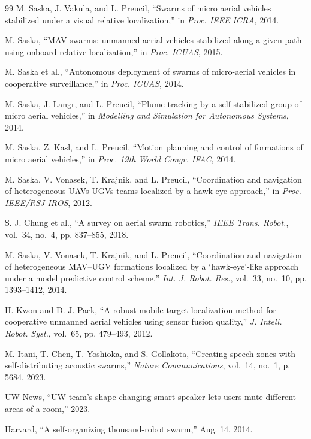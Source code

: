 \documentclass[journal,twoside]{IEEEtran}
\begin{document}
\begin{thebibliography}{99}
M. Saska, J. Vakula, and L. Preucil, ``Swarms of micro aerial vehicles stabilized under a visual relative localization,'' in \emph{Proc. IEEE ICRA}, 2014.

M. Saska, ``{MAV}-swarms: unmanned aerial vehicles stabilized along a given path using onboard relative localization,'' in \emph{Proc. ICUAS}, 2015.

M. Saska et al., ``Autonomous deployment of swarms of micro-aerial vehicles in cooperative surveillance,'' in \emph{Proc. ICUAS}, 2014.

M. Saska, J. Langr, and L. Preucil, ``Plume tracking by a self-stabilized group of micro aerial vehicles,'' in \emph{Modelling and Simulation for Autonomous Systems}, 2014.

M. Saska, Z. Kasl, and L. Preucil, ``Motion planning and control of formations of micro aerial vehicles,'' in \emph{Proc. 19th World Congr. IFAC}, 2014.

M. Saska, V. Vonasek, T. Krajnik, and L. Preucil, ``Coordination and navigation of heterogeneous {UAV}s-{UGV}s teams localized by a hawk-eye approach,'' in \emph{Proc. IEEE/RSJ IROS}, 2012.

S. J. Chung et al., ``A survey on aerial swarm robotics,'' \emph{IEEE Trans. Robot.}, vol.~34, no.~4, pp. 837--855, 2018.

M. Saska, V. Vonasek, T. Krajnik, and L. Preucil, ``Coordination and navigation of heterogeneous {MAV}–{UGV} formations localized by a ‘hawk-eye’-like approach under a model predictive control scheme,'' \emph{Int. J. Robot. Res.}, vol.~33, no.~10, pp. 1393--1412, 2014.

H. Kwon and D. J. Pack, ``A robust mobile target localization method for cooperative unmanned aerial vehicles using sensor fusion quality,'' \emph{J. Intell. Robot. Syst.}, vol.~65, pp. 479--493, 2012.

M. Itani, T. Chen, T. Yoshioka, and S. Gollakota, ``Creating speech zones with self-distributing acoustic swarms,'' \emph{Nature Communications}, vol.~14, no.~1, p. 5684, 2023.

UW News, ``{UW} team's shape-changing smart speaker lets users mute different areas of a room,'' 2023.

Harvard, ``A self-organizing thousand-robot swarm,'' Aug. 14, 2014.


\end{thebibliography}
\end{document}
